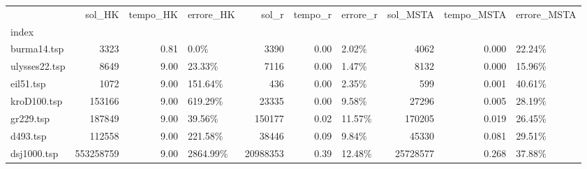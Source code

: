 \begin{tabular}{lrrlrrlrrl}
\toprule
{} &     sol\_HK &  tempo\_HK & errore\_HK &     sol\_r &  tempo\_r & errore\_r &  sol\_MSTA &  tempo\_MSTA & errore\_MSTA \\
index         &            &           &           &           &          &          &           &             &             \\
\midrule
burma14.tsp   &       3323 &      0.81 &      0.0\% &      3390 &     0.00 &    2.02\% &      4062 &       0.000 &      22.24\% \\
ulysses22.tsp &       8649 &      9.00 &    23.33\% &      7116 &     0.00 &    1.47\% &      8132 &       0.000 &      15.96\% \\
eil51.tsp     &       1072 &      9.00 &   151.64\% &       436 &     0.00 &    2.35\% &       599 &       0.001 &      40.61\% \\
kroD100.tsp   &     153166 &      9.00 &   619.29\% &     23335 &     0.00 &    9.58\% &     27296 &       0.005 &      28.19\% \\
gr229.tsp     &     187849 &      9.00 &    39.56\% &    150177 &     0.02 &   11.57\% &    170205 &       0.019 &      26.45\% \\
d493.tsp      &     112558 &      9.00 &   221.58\% &     38446 &     0.09 &    9.84\% &     45330 &       0.081 &      29.51\% \\
dsj1000.tsp   &  553258759 &      9.00 &  2864.99\% &  20988353 &     0.39 &   12.48\% &  25728577 &       0.268 &      37.88\% \\
\bottomrule
\end{tabular}
